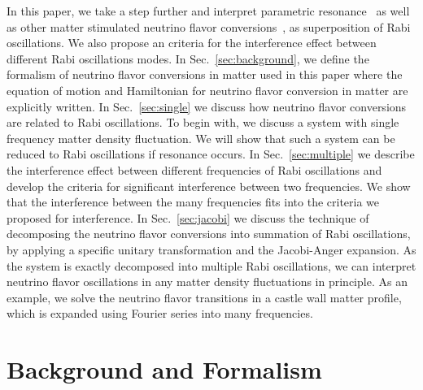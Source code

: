 \documentclass[%
reprint,
 amsmath,amssymb,
 prd,
]{revtex4-1}
\begin{document}
In this paper, we take a step further and interpret parametric resonance~\cite{Akhmedov2000, Krastev1989} as well as other matter stimulated neutrino flavor conversions~\cite{Kneller2013, Patton2014}, as superposition of Rabi oscillations. We also propose an criteria for the interference effect between different Rabi oscillations modes. In Sec.~\ref{sec:background}, we define the formalism of neutrino flavor conversions in matter used in this paper where the equation of motion and Hamiltonian for neutrino flavor conversion in matter are explicitly written. In Sec.~\ref{sec:single} we discuss how neutrino flavor conversions are related to Rabi oscillations. To begin with, we discuss a system with single frequency matter density fluctuation. We will show that such a system can be reduced to Rabi oscillations if resonance occurs. In Sec.~\ref{sec:multiple} we describe the interference effect between different frequencies of Rabi oscillations and develop the criteria for significant interference between two frequencies. We show that the interference between the many frequencies fits into the criteria we proposed for interference. In Sec.~\ref{sec:jacobi} we discuss the technique of decomposing the neutrino flavor conversions into summation of Rabi oscillations, by applying a specific unitary transformation and the Jacobi-Anger expansion. As the system is exactly decomposed into multiple Rabi oscillations, we can interpret neutrino flavor oscillations in any matter density fluctuations in principle. As an example, we solve the neutrino flavor transitions in a castle wall matter profile, which is expanded using Fourier series into many frequencies.



\section{\label{sec:background}Background and Formalism}

\end{document}
